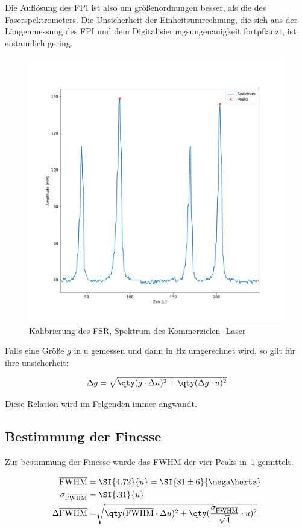 \documentclass[slug=GL, room=HZDR\ Dresden/Rossendorf\,\ Geb.\ 620/123, supervisor=Tim\ Ziegler]{../../Lab_Report_LaTeX/lab_report}
\newcommand{\hne}{\ce{HeNe}-Laser}
\begin{document}
Die Aufl\"osung des FPI ist also um gr\"o\ss{}enordnungen besser, als
die des Faserspektrometers.  Die Unsicherheit der Einheitsumrechnung,
die sich aus der L\"angenmessung des FPI und dem
Digitalisierungsungenauigkeit fortpflanzt, ist erstaunlich gering.

\begin{figure}[b]\centering
  \includegraphics[width=.8\columnwidth]{figs/fsrkalib.pdf}
  \caption{Kalibrierung des FSR, Spektrum des Kommerzielen \hne{}}
  \label{fig:fsrkalib}
\end{figure}

Falls eine Gr\"o\ss{}e \(g\) in \si{u} gemessen und dann in \si{\hertz}
umgerechnet wird, so gilt f\"ur ihre unsicherheit:

\begin{equation}
  \label{eq:uerr}
  \Delta g = \sqrt{\qty(g\cdot\Delta u)^2 + \qty(\Delta g\cdot u)^2}
\end{equation}

Diese Relation wird im Folgenden immer angwandt.

\subsection{Bestimmung der Finesse}
\label{sec:bestfinesse}

Zur bestimmung der Finesse wurde das FWHM der vier Peaks
in~\ref{fig:fsrkalib} gemittelt.

\begin{align}
  \label{eq:fwhmlaser}
  \overline{\text{FWHM}} =&\; \SI{4.72}{u} = \SI{81\pm
  6}{\mega\hertz} \\
  \sigma_{\overline{\text{FWHM}}} =&\; \SI{.31}{u}\\
  \Delta\overline{\text{FWHM}} =&
  \sqrt{\qty(\overline{\text{FWHM}}\cdot\Delta u)^2 +
  \qty(\frac{\sigma_{\overline{\text{FWHM}}}}{\sqrt{4}}\cdot u)^2}
\end{align}
\end{document}
